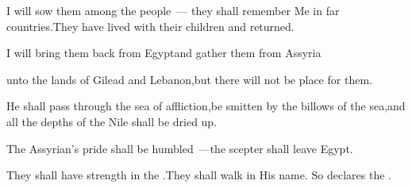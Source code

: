 \begin{inparaenum}
  \pa{} I will sow them among the people~--- they shall remember Me in far countries.\pa{}They have lived with their children and returned.%

  \pa{} I will bring them back from Egypt\pa{}and gather them from Assyria%

  \pa{}unto the lands of Gilead and Lebanon,\pa{}but there will not be place for them.%

  \pa{} He shall pass through the sea of affliction,\pa{}be smitten by the billows of the sea,\pa{}and all the depths of the Nile shall be dried up.%

  \pa{}The Assyrian's pride shall be humbled~---\pa{}the scepter shall leave Egypt.%

  \pa{} They shall have strength in the \lord.\pa{}They shall walk in His name. So declares the \lord.%
\end{inparaenum}
